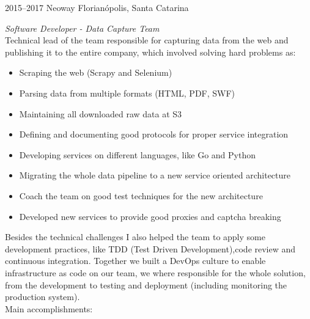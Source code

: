\documentclass[]{friggeri-cv} %
\begin{document}
\begin{entrylist}
\entry
{2015--2017}
{Neoway}
{Florianópolis, Santa Catarina}
{\emph{Software Developer - Data Capture Team} \\

    Technical lead of the team responsible for capturing data from the web and publishing it to the entire company,
which involved solving hard problems as:\\

\begin{itemize}
    \item Scraping the web (Scrapy and Selenium)
    \item Parsing data from multiple formats (HTML, PDF, SWF)
    \item Maintaining all downloaded raw data at S3
    \item Defining and documenting good protocols for proper service integration
    \item Developing services on different languages, like Go and Python
    \item Migrating the whole data pipeline to a new service oriented architecture
    \item Coach the team on good test techniques for the new architecture
    \item Developed new services to provide good proxies and captcha breaking
\end{itemize}

Besides the technical challenges I also helped the team to apply some
development practices, like TDD (Test Driven Development),code review
and continuous integration.
Together we built a DevOps culture to enable infrastructure as code
on our team, we where responsible for the whole solution, from the development
to testing and deployment (including monitoring the production system).\\

Main accomplishments:

}
\end{entrylist}
\end{document}
